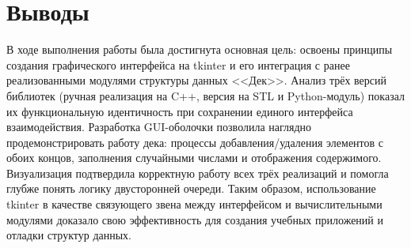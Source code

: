 \documentclass[oneside,a4paper,14pt]{extarticle} %
\begin{document}
	\section*{Выводы} В ходе выполнения работы была достигнута основная цель: освоены принципы создания графического интерфейса на tkinter и его интеграция с ранее реализованными модулями структуры данных <<Дек>>. Анализ трёх версий библиотек (ручная реализация на C++, версия на STL и Python-модуль) показал их функциональную идентичность при сохранении единого интерфейса взаимодействия. Разработка GUI-оболочки позволила наглядно продемонстрировать работу дека: процессы добавления/удаления элементов с обоих концов, заполнения случайными числами и отображения содержимого. Визуализация подтвердила корректную работу всех трёх реализаций и помогла глубже понять логику двусторонней очереди. Таким образом, использование tkinter в качестве связующего звена между интерфейсом и вычислительными модулями доказало свою эффективность для создания учебных приложений и отладки структур данных.
	
\end{document}
